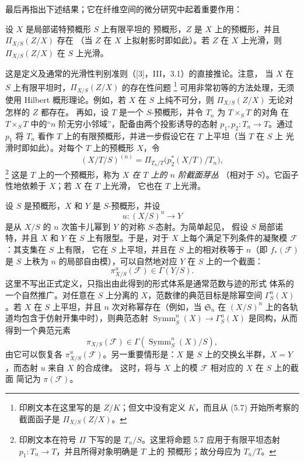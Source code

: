 最后再指出下述结果；它在纤维空间的微分研究中起着重要作用：

 设 $X$ 是局部诺特预概形 $S$ 上有限平坦的
预概形，$Z$ 是 $X$ 上的预概形，并且 $\Pi_{X/S}(Z/X)$ 存在
（当 $Z$ 在 $X$ 上拟射影时即如此）。若 $Z$ 在 $X$ 上光滑，则
$\Pi_{X/S}(Z/X)$ 在 $S$ 上光滑。

这是定义及通常的光滑性判别准则（[3]，III，3.1）的直接推论。注意，
当 $X$ 在 $S$ 上有限平坦时，$\Pi_{X/S}(Z/X)$ 的存在性问题
\footnote{印刷文本在这里写的是 $Z/K$；但文中没有定义 $K$，而且从
(5.7) 开始所考察的截面函子是 $\Pi_{X/S}(Z/X)$。}
可用非常初等的方法处理，无须使用 Hilbert 概形理论。例如，若 $X$
在 $S$ 上纯不可分，则 $\Pi_{X/S}(Z/X)$ 无论对怎样的 $Z$ 都存在。
再如，设 $T$ 是一个 $S$-预概形，并令 $T_n$ 为 $T\times_ST$ 的对角
在 $T\times_ST$ 中的“$n$ 阶无穷小邻域”，配备由两个投影诱导的态射
$p_1,p_2:T_n\longrightarrow T$。通过 $p_1$ 将 $T_n$ 看作 $T$
上的有限预概形，并进一步假设它在 $T$ 上平坦（当 $T$ 在 $S$ 上
光滑时即如此）。对每个 $T$ 上的预概形 $X$，令
\[
(X/T/S)^{(n)}=
\Pi_{T_n/T}\bigl(p_2^*(X/T)/T_n\bigr),
\]
\footnote{印刷文本在符号 $\Pi$ 下写的是 $T_n/S$。这里将命题 5.7
应用于有限平坦态射 $p_1:T_n\to T$，并且所得对象明确是 $T$ 上的
预概形；故分母应为 $T_n/T$。}
这是 $T$ 上的一个预概形，称为 \emph{$X$ 在 $T$ 上的 $n$ 阶截面芽丛}
（相对于 $S$）。它函子性地依赖于 $X$；若 $X$ 在 $T$ 上光滑，
它也在 $T$ 上光滑。


设 $S$ 是预概形，$X$ 和 $Y$ 是 $S$-预概形，并设
\[
u:(X/S)^n\longrightarrow Y
\]
是从 $X/S$ 的 $n$ 次笛卡儿幂到 $Y$ 的对称 $S$-态射。为简单起见，
假设 $S$ 局部诺特，并且 $X$ 和 $Y$ 在 $S$ 上有限型。于是，对于
$X$ 上每个满足下列条件的凝聚模 $\mathcal F$：其支集在 $S$ 上有限，
它在 $S$ 上平坦，并且在 $S$ 上的相对秩等于 $n$（即
$f_*(\mathcal F)$ 是 $S$ 上秩为 $n$ 的局部自由模），可以自然地对应
$Y$ 在 $S$ 上的一个截面：
\[
\pi^u_{X/S}(\mathcal F)\in\Gamma(Y/S).
\]
这里不写出正式定义，只指出由此得到的形式体系是通常范数与迹的形式
体系的一个自然推广。对任意在 $S$ 上分离的 $X$，范数律的典范目标是除幂空间 $\Gamma^n_S(X)$。若 $X$ 在 $S$ 上平坦，并且 $n$ 次对称幂存在（例如，当 $\mathfrak S_n$ 在 $(X/S)^n$ 上的各轨道均包含于仿射开集中时），则典范态射 $\operatorname{Symm}^n_S(X)\to\Gamma^n_S(X)$ 是同构，从而得到一个典范元素
\[
\pi_{X/S}(\mathcal F)\in\Gamma(\operatorname{Symm}^n_S(X)/S),
\]
由它可以恢复各 $\pi^u_{X/S}(\mathcal F)$。另一重要情形是：$X$
是 $S$ 上的交换幺半群，$X=Y$，而态射 $u$ 来自 $X$ 的合成律。
这时，将与 $X$ 上的模 $\mathcal F$ 相对应的 $X$ 在 $S$ 上的截面
简记为 $\pi(\mathcal F)$。

